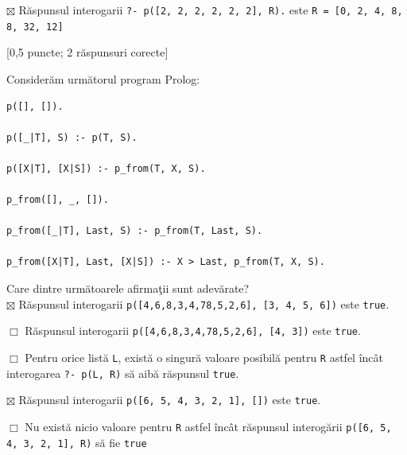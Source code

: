 \documentclass[12pt]{article}
\newcommand{\probex}{\stepcounter{uebno}{\vspace{0.3cm}\noindent \bf (P\arabic{uebno}) }}
\begin{document}
$\boxtimes$ R\u{a}spunsul interogarii \texttt{?- p([2, 2, 2, 2, 2, 2], R).} este \texttt{R = [0, 2, 4, 8, 8, 32, 12]}

\probex [0,5 puncte; 2 r\u{a}spunsuri corecte]

Consider\u{a}m urm\u{a}torul program Prolog: 
\begin{verbatim}
p([], []).

p([_|T], S) :- p(T, S).

p([X|T], [X|S]) :- p_from(T, X, S).

p_from([], _, []).

p_from([_|T], Last, S) :- p_from(T, Last, S).

p_from([X|T], Last, [X|S]) :- X > Last, p_from(T, X, S).
\end{verbatim}
Care dintre urm\u{a}toarele afirma\c{t}ii sunt adev\u{a}rate? \\ 
$\boxtimes$ R\u{a}spunsul interogarii \texttt{p([4,6,8,3,4,78,5,2,6], [3, 4, 5, 6])} este \texttt{true}.

$\Box$ R\u{a}spunsul interogarii \texttt{p([4,6,8,3,4,78,5,2,6], [4, 3])} este \texttt{true}.

$\Box$ Pentru orice list\u{a} \texttt{L}, exist\u{a} o singur\u{a} valoare posibil\u{a} pentru \texttt{R} 
astfel \^{i}nc\^{a}t interogarea \texttt{?- p(L, R)} s\u{a} aib\u{a} r\u{a}spunsul \texttt{true}. 

$\boxtimes$ R\u{a}spunsul interogarii \texttt{p([6, 5, 4, 3, 2, 1], [])} este \texttt{true}. 

$\Box$ Nu exist\u{a} nicio valoare pentru \texttt{R} astfel \^{i}nc\^{a}t 
r\u{a}spunsul interog\u{a}rii \texttt{p([6, 5, 4, 3, 2, 1], R)} s\u{a} fie \texttt{true}
\end{document}
